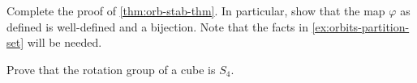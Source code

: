 \documentclass[./main.tex]{subfiles}
\begin{document}
\begin{exercise}
\label{ex:orb-stab-thm}
Complete the proof of \cref{thm:orb-stab-thm}. In particular, show that the map
$\varphi$ as defined is well-defined and a bijection. Note that
the facts in \cref{ex:orbits-partition-set} will be needed.
\end{exercise}

\begin{exercise}
    Prove that the rotation group of a cube is $S_4$.
\end{exercise}
\end{document}
